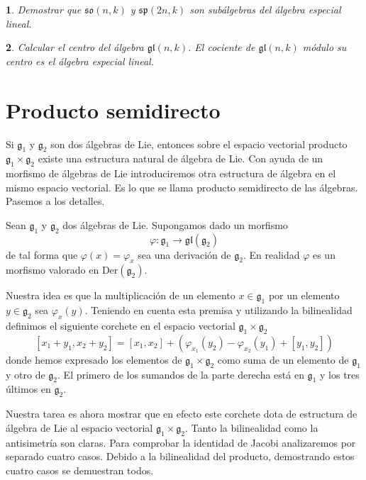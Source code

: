 \documentclass[a4paper,draft,12pt]{scrartcl}
\newtheorem{pro1}{}%
\newenvironment{pro}{\begin{pro1} \rm} {\end{pro1}}
\newcommand{\lto}{\longrightarrow}%
\newcommand{\df}[1]{\textsf{\color{blue}#1}}
\begin{document}
\begin{pro}

Demostrar que $\mathfrak{so}(n,k)$ y $\mathfrak{sp}(2n,k)$ son subálgebras del álgebra especial lineal.

\end{pro}

\begin{pro}

Calcular el centro del álgebra $\mathfrak{gl}(n,k)$.  El cociente de $\mathfrak{gl}(n,k)$ módulo su centro es el álgebra especial lineal.

\end{pro}

\newpage

\section{Producto semidirecto}

Si $\mathfrak{g}_1$ y $\mathfrak{g}_2$ son dos álgebras de Lie, entonces sobre el espacio vectorial producto $\mathfrak{g}_1 \times \mathfrak{g}_2$ existe una estructura natural de álgebra de Lie.  Con ayuda de un morfismo de álgebras de Lie introduciremos otra estructura de álgebra en el mismo espacio vectorial.  Es lo que se llama  \df{producto semidirecto}  de las álgebras.  Pasemos a los detalles.

Sean $\mathfrak{g}_1$ y $\mathfrak{g}_2$ dos  álgebras de Lie.  Supongamos dado un morfismo 
$$
\varphi: \mathfrak{g}_1 \lto \mathfrak{gl}(\mathfrak{g}_2)
$$
de tal forma que $\varphi(x)=\varphi_x$ sea una derivación de $\mathfrak{g}_2$.  En realidad $\varphi$ es un morfismo valorado en $\mathrm{Der}(\mathfrak{g}_2)$.

Nuestra idea es que la multiplicación de un elemento $x \in \mathfrak{g}_1$ por un elemento $y \in \mathfrak{g}_2$ sea $\varphi_x(y)$.  Teniendo en cuenta esta premisa y utilizando la bilinealidad definimos el siguiente corchete en el espacio vectorial $\mathfrak{g}_1 \times \mathfrak{g}_2$
$$
[x_1+y_1, x_2+y_2]= [x_1,x_2]+(\varphi_{x_1}(y_2)- \varphi_{x_2}(y_1)+ [y_1,y_2])
$$
donde hemos expresado los elementos de $\mathfrak{g}_1 \times \mathfrak{g}_2$ como suma de un elemento de $\mathfrak{g}_1$ y otro de $\mathfrak{g}_2$.  El primero de los sumandos de la parte derecha está en $\mathfrak{g}_1$ y los tres últimos en $\mathfrak{g}_2$.

Nuestra tarea es ahora mostrar que en efecto este corchete dota de estructura de álgebra de Lie al espacio vectorial $\mathfrak{g}_1 \times \mathfrak{g}_2$.  Tanto la bilinealidad como la antisimetría son claras.  Para comprobar la identidad de Jacobi analizaremos por separado cuatro casos. Debido a la bilinealidad del producto, demostrando estos cuatro casos se demuestran todos.
\end{document}
